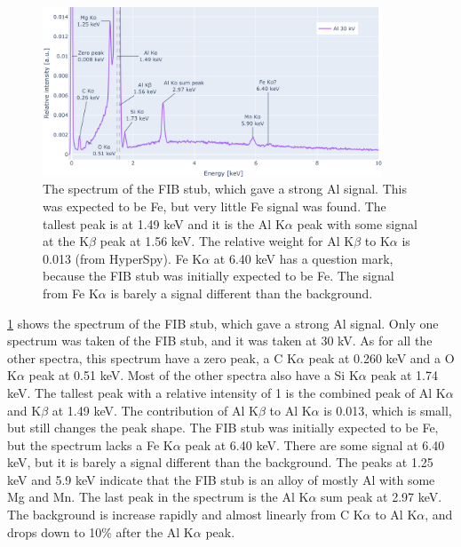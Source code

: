 \begin{figure}[h!]
    \centering
    \includegraphics[width=0.90\textwidth]{figures/each_spectra_not_on_github/Al_everything.png}
    \caption{
        The spectrum of the FIB stub, which gave a strong Al signal.
        This was expected to be Fe, but very little Fe signal was found.
        The tallest peak is at 1.49 keV and it is the Al K$\alpha$ peak with some signal at the K$\beta$ peak at 1.56 keV.
        The relative weight for Al K$\beta$ to K$\alpha$ is 0.013 (from HyperSpy).
        Fe K$\alpha$ at 6.40 keV has a question mark, because the FIB stub was initially expected to be Fe.
        The signal from Fe K$\alpha$ is barely a signal different than the background.
    }
    \label{fig:results:Spectra_Al}
\end{figure}

\cref{fig:results:Spectra_Al} shows the spectrum of the FIB stub, which gave a strong Al signal.
Only one spectrum was taken of the FIB stub, and it was taken at 30 kV.
As for all the other spectra, this spectrum have a zero peak, a C K$\alpha$ peak at 0.260 keV and a O K$\alpha$ peak at 0.51 keV.
Most of the other spectra also have a Si K$\alpha$ peak at 1.74 keV.
The tallest peak with a relative intensity of 1 is the combined peak of Al K$\alpha$ and K$\beta$ at 1.49 keV.
The contribution of Al K$\beta$ to Al K$\alpha$ is 0.013, which is small, but still changes the peak shape.
The FIB stub was initially expected to be Fe, but the spectrum lacks a Fe K$\alpha$ peak at 6.40 keV.
There are some signal at 6.40 keV, but it is barely a signal different than the background.
The peaks at 1.25 keV and 5.9 keV indicate that the FIB stub is an alloy of mostly Al with some Mg and Mn.
The last peak in the spectrum is the Al K$\alpha$ sum peak at 2.97 keV. %
The background is increase rapidly and almost linearly from C K$\alpha$ to Al K$\alpha$, and drops down to 10\% after the Al K$\alpha$ peak.



